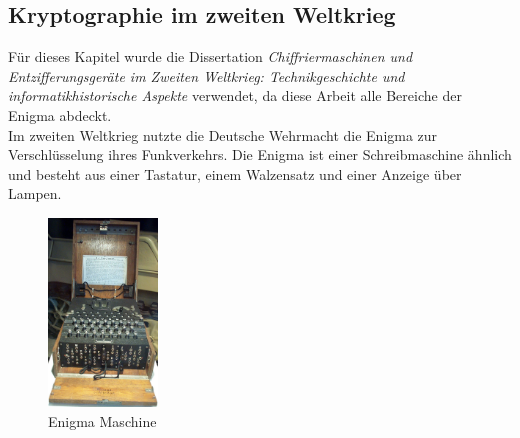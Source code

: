 \subsection{Kryptographie im zweiten Weltkrieg}
Für dieses Kapitel wurde die Dissertation \textit{Chiffriermaschinen und Entzifferungsgeräte
im Zweiten Weltkrieg: Technikgeschichte und informatikhistorische Aspekte} \cite{enigma} verwendet, da diese Arbeit alle Bereiche der Enigma abdeckt. \\
Im zweiten Weltkrieg nutzte die Deutsche Wehrmacht die Enigma zur Verschlüsselung ihres Funkverkehrs. Die Enigma ist einer Schreibmaschine ähnlich und besteht aus einer Tastatur, einem Walzensatz und einer Anzeige über Lampen. 
%
\begin{figure}[ht]
\begin{center}
\includegraphics[height=5cm]{images/Enigma_Verkehrshaus_Luzern_cropped.jpg}
\caption[Enigma Maschine Quelle:\newline ~~~~http://upload.wikimedia.org/wikipedia/commons/d/d1/\newline Enigma\_Verkehrshaus\_Luzern\_cropped.jpg]{Enigma Maschine}
\label{fig:enigma}
\end{center}
\end{figure}
%

